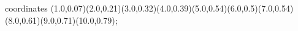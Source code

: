 					coordinates { (1.0,0.07)(2.0,0.21)(3.0,0.32)(4.0,0.39)(5.0,0.54)(6.0,0.5)(7.0,0.54)(8.0,0.61)(9.0,0.71)(10.0,0.79)};
